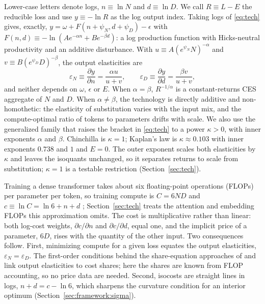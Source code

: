 Lower-case letters denote logs, $n\equiv\ln N$ and $d\equiv\ln D$. We call $R\equiv L-E$ the reducible loss and use
$y\equiv-\ln R$ as the log output index. Taking logs of \eqref{eq:tech} gives, exactly,
$y=\omega+F(n+\psi_N,d+\psi_D)-\epsilon$ with $F(n,d)\equiv-\ln(Ae^{-\alpha n}+Be^{-\beta d})$: a log production
function with Hicks-neutral productivity and an additive disturbance. With $u\equiv A(e^{\psi_N}N)^{-\alpha}$ and
$v\equiv B(e^{\psi_D}D)^{-\beta}$, the output elasticities are
\begin{equation}\label{eq:elast}
\varepsilon_N\equiv\frac{\partial y}{\partial n}=\frac{\alpha u}{u+v},\qquad
\varepsilon_D\equiv\frac{\partial y}{\partial d}=\frac{\beta v}{u+v},
\end{equation}
and neither depends on $\omega$, $\epsilon$ or $E$. When $\alpha=\beta$, $R^{-1/\alpha}$ is a constant-returns CES
aggregate of $N$ and $D$. When $\alpha\neq\beta$, the technology is directly additive and non-homothetic: the
elasticity of substitution varies with the input mix, and the compute-optimal ratio of tokens to parameters drifts
with scale. We also use the generalized family that raises the bracket in \eqref{eq:tech} to a power $\kappa>0$,
with inner exponents $\alpha$ and $\beta$. Chinchilla is $\kappa=1$; Kaplan's law is
$\kappa\approx0.103$ with inner exponents $0.738$ and $1$ and $E=0$. The outer exponent scales both elasticities by
$\kappa$ and leaves the isoquants unchanged, so it separates returns to scale from substitution; $\kappa=1$ is a
testable restriction (Section~\ref{sec:tech}).

Training a dense transformer takes about six floating-point operations (FLOPs) per parameter per token, so training
compute is $C=6ND$ and $c\equiv\ln C=\ln6+n+d$ \citep{kaplan2020scaling}; Section~\ref{sec:tech} treats the
attention and embedding FLOPs this approximation omits. The cost is multiplicative rather than linear: both log-cost
weights, $\partial c/\partial n$ and $\partial c/\partial d$, equal one, and the implicit price of a parameter, $6D$,
rises with the quantity of the other input. Two consequences follow. First, minimizing compute for a given loss
equates the output elasticities, $\varepsilon_N=\varepsilon_D$. The first-order conditions behind the share-equation
approaches of \citet{deloecker2012markups} and \citet{gandhi2020identification} link output elasticities to cost
shares; here the shares are known from FLOP accounting, so no price data are needed. Second, isocosts are straight
lines in logs, $n+d=c-\ln6$, which sharpens the curvature condition for an interior optimum
(Section~\ref{sec:framework:sigma}).

